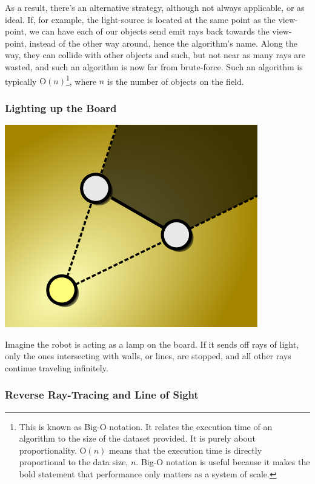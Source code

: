 \documentclass[letterpaper, 12pt]{article}
\begin{document}
\begin{multicols}{2}
As a result, there's an alternative strategy, although not always applicable, or
as ideal. If, for example, the light-source is located at the same point as the
view-point, we can have each of our objects send emit rays back towards the
view-point, instead of the other way around, hence the algorithm's name. Along
the way, they can collide with other objects and such, but not near as many rays
are wasted, and such an algorithm is now far from brute-force. Such an algorithm
is typically \(\mathrm{O}(n)\)\footnote{This is known as Big-O notation. It
relates the execution time of an algorithm to the size of the dataset provided.
It is purely about proportionality. \(\mathrm{O}(n)\) means that the execution
time is directly proportional to the data size, \(n\). Big-O notation is useful
because it makes the bold statement that performance only matters as a system of
scale.}, where \(n\) is the number of objects on the field.

\subsubsection{Lighting up the Board}

\includegraphics[width=\columnwidth]{img/light.pdf}

Imagine the robot is acting as a lamp on the board. If it sends off rays of
light, only the ones intersecting with walls, or lines, are stopped, and all
other rays continue traveling infinitely.

\subsubsection{Reverse Ray-Tracing and Line of Sight}


\end{multicols}
\end{document}

